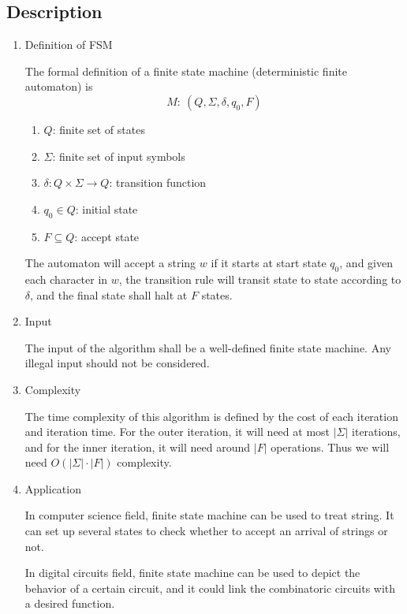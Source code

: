 \documentclass{article}
\begin{document}
\subsection*{Description}
\begin{enumerate}
\item Definition of FSM

The formal definition of a finite state machine (deterministic finite automaton) is 
\[
	M:~(Q, \Sigma, \delta, q_0, F)
\]
\begin{enumerate}
\item $Q$: finite set of states
\item $\Sigma$: finite set of input symbols
\item $\delta: Q\times \Sigma \rightarrow Q$: transition function 
\item $q_0 \in Q$: initial state
\item $F \subseteq Q$: accept state
\end{enumerate}
The automaton will accept a string $w$ if it starts at start state $q_0 $, and given each character in $w$, the transition rule will transit state to state according to $\delta$, and the final state shall halt at $F$ states.

\item Input 

The input of the algorithm shall be a well-defined finite state machine. Any illegal input should not be considered.

\item Complexity

The time complexity of this algorithm is defined by the cost of each iteration and iteration time. For the outer iteration, it will need at most $|\Sigma|$ iterations, and for the inner iteration, it will need around $|F|$ operations. Thus we will need $O(|\Sigma|\cdot |F|)$ complexity.
\newpage
\item Application

In computer science field, finite state machine can be used to treat string. It can set up several states to check whether to accept an arrival of strings or not.


In digital circuits field, finite state machine can be used to depict the behavior of a certain circuit, and it could link the combinatoric circuits with a desired function.



\end{enumerate}
\end{document}
